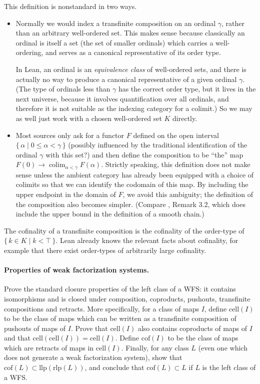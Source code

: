 \documentclass{article}
\theoremstyle{definition}
\theoremstyle{plain}
\newcommand{\cell}{\mathrm{cell}}
\newcommand{\cof}{\mathrm{cof}}
\newcommand{\llp}{\mathrm{llp}}
\newcommand{\rlp}{\mathrm{rlp}}
\DeclareMathOperator{\colim}{colim}
\begin{document}
This definition is nonstandard in two ways.
\begin{itemize}
\item
  Normally we would index a transfinite composition on an ordinal $\gamma$, rather than an arbitrary well-ordered set.
  This makes sense because classically an ordinal is itself a set (the set of smaller ordinals) which carries a well-ordering, and serves as a canonical representative of its order type.

  In Lean, an ordinal is an \emph{equivalence class} of well-ordered sets, and there is actually no way to produce a canonical representative of a given ordinal $\gamma$.
  (The type of ordinals less than $\gamma$ has the correct order type, but it lives in the next universe, because it involves quantification over all ordinals, and therefore it is not suitable as the indexing category for a colimit.)
  So we may as well just work with a chosen well-ordered set $K$ directly.

\item
  Most sources only ask for a functor $F$ defined on the open interval $\{\,\alpha \mid 0 \le \alpha < \gamma\,\}$ (possibly influenced by the traditional identification of the ordinal $\gamma$ with this set?) and then define the composition to be ``the'' map $F(0) \to \colim_{\alpha < \gamma} F(\alpha)$.
  Strictly speaking, this definition does not make sense unless the ambient category has already been equipped with a choice of colimits so that we can identify the codomain of this map.
  By including the upper endpoint in the domain of $F$, we avoid this ambiguity; the definition of the composition also becomes simpler.
  (Compare \cite{R}, Remark 3.2, which does include the upper bound in the definition of a smooth chain.)
\end{itemize}

The cofinality of a transfinite composition is the cofinality of the order-type of $\{\,k \in K \mid k < \top\,\}$.
Lean already knows the relevant facts about cofinality, for example that there exist order-types of arbitrarily large cofinality.

\paragraph{Properties of weak factorization systems.}
Prove the standard closure properties of the left class of a WFS: it contains isomorphisms and is closed under composition, coproducts, pushouts, transfinite compositions and retracts.
More specifically, for a class of maps $I$, define $\cell(I)$ to be the class of maps which can be written as a transfinite composition of pushouts of maps of $I$.
Prove that $\cell(I)$ also contains coproducts of maps of $I$ and that $\cell(\cell(I)) = \cell(I)$.
Define $\cof(I)$ to be the class of maps which are retracts of maps in $\cell(I)$.
Finally, for any class $L$ (even one which does not generate a weak factorization system), show that $\cof(L) \subset \llp(\rlp(L))$, and conclude that $\cof(L) \subset L$ if $L$ is the left class of a WFS.
\end{document}
